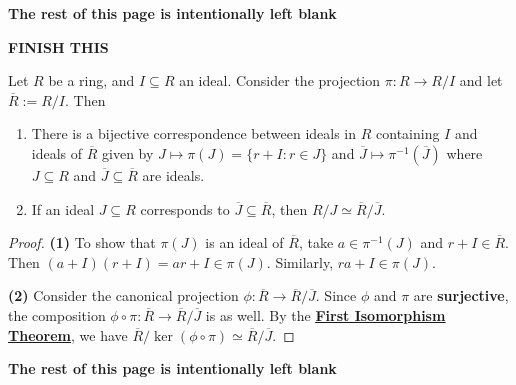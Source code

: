 \documentclass [12pt] {article}
\newenvironment{theorem}[1]{\begin{tcolorbox}[title={Theorem #1},colback=green!5!white,colframe=black!75!green]}{\end{tcolorbox}}
\renewcommand{\href}[2]{\hyperref[#1]{\bf{\underline{{#2}}}}}
\renewcommand{\bf}[1]{\textbf{{#1}}}
\begin{document}
\begin{center}
    \vspace{5em}
    \bf{The rest of this page is intentionally left blank}
\end{center}

\newpage
\bf{FINISH THIS}
\begin{theorem}{(Correspondence Theorem)}
    Let $R$ be a ring, and $I \subseteq R$ an ideal. Consider the projection $\pi : R \to R/I$ and
    let $\overline{R} := R/I$. Then
    \begin{enumerate}[label=(\arabic*)]
        \item There is a bijective correspondence between ideals in $R$ containing $I$ and ideals of
            $\overline{R}$ given by $J \mapsto \pi(J) = \{ r + I : r \in J \}$ and 
            $\overline{J} \mapsto \pi^{-1}(\overline{J})$ where $J \subseteq R$ and 
            $\overline{J} \subseteq \overline{R}$ are ideals.
        \item If an ideal $J \subseteq R$ corresponds to $\overline{J} \subseteq \overline{R}$, then
            $R/J \simeq \overline{R}/\overline{J}$.
    \end{enumerate}
\end{theorem}
\begin{proof}
    \bf{(1)} To show that $\pi(J)$ is an ideal of $\overline{R}$, take $a \in \pi^{-1}(J)$ and
    $r + I \in \overline{R}$. Then $(a + I)(r + I) = ar + I \in \pi(J)$. Similarly, 
    $ra + I \in \pi(J)$.
    \vspace{1em}

    \bf{(2)} Consider the canonical projection $\phi : \overline{R} \to \overline{R}/\overline{J}$.
    Since $\phi$ and $\pi$ are \bf{surjective}, the composition 
    $\phi \circ \pi : \overline{R} \to \overline{R}/\overline{J}$ is as well.
    By the \href{thm:isothm}{First Isomorphism Theorem}, we have
    $\overline{R}/\ker(\phi \circ \pi) \simeq \overline{R}/\overline{J}$.
\end{proof}

\begin{center}
    \vspace{5em}
    \bf{The rest of this page is intentionally left blank}
\end{center}
\end{document}
